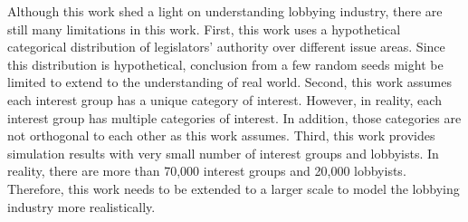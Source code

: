 \documentclass{article}
\begin{document}
Although this work shed a light on understanding lobbying industry, 
there are still many limitations in this work. First, this work 
uses a hypothetical categorical distribution of 
legislators' authority over different issue areas.
Since this distribution is hypothetical, 
conclusion from a few random seeds might be limited to 
extend to the understanding of real world.
Second, this work assumes each interest group has a unique 
category of interest. However, in reality, each 
interest group has multiple categories of interest. 
In addition, those categories are not orthogonal to each other 
as this work assumes.
Third, this work provides simulation results with 
very small number of interest groups and lobbyists. In reality,
there are more than 70,000 interest groups and 20,000 lobbyists.
Therefore, this work needs to be extended to a larger scale
to model the lobbying industry more realistically.


\end{document}
